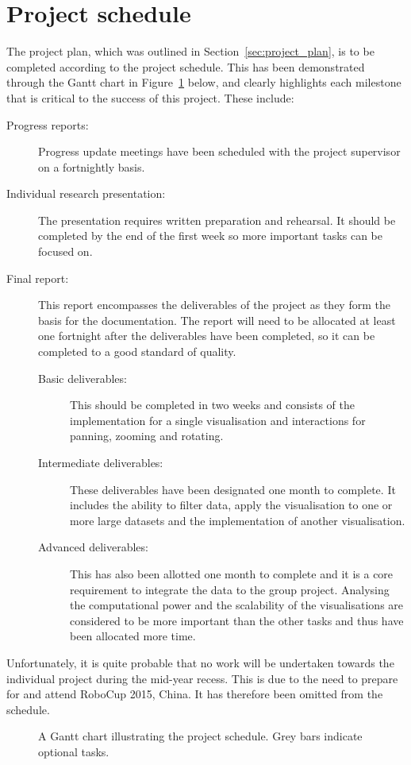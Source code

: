 \documentclass[
	fontsize=11pt
	headlines=2,
	footlines=2,
	parskip=half
]{scrartcl}
\begin{document}
	\section{Project schedule} {
	\label{sec:project_schedule}
	
		The project plan, which was outlined in Section~\ref{sec:project_plan}, is to be completed according to the project schedule. This has been demonstrated through the Gantt chart in Figure~\ref{gantt:schedule} below, and clearly highlights each milestone that is critical to the success of this project. These include:
		
		\begin{description}
			\item[Progress reports:] Progress update meetings have been scheduled with the project supervisor on a fortnightly basis.
			\item[Individual research presentation:] The presentation requires written preparation and rehearsal. It should be completed by the end of the first week so more important tasks can be focused on.
			\item[Final report:] This report encompasses the deliverables of the project as they form the basis for the documentation. The report will need to be allocated at least one fortnight after the deliverables have been completed, so it can be completed to a good standard of quality.
			\begin{description}
				\item[Basic deliverables:] This should be completed in two weeks and consists of the implementation for a single visualisation and interactions for panning, zooming and rotating.
				\item[Intermediate deliverables:] These deliverables have been designated one month to complete. It includes the ability to filter data, apply the visualisation to one or more large datasets and the implementation of another visualisation.
				\item[Advanced deliverables:] This has also been allotted one month to complete and it is a core requirement to integrate the data to the group project. Analysing the computational power and the scalability of the visualisations are considered to be more important than the other tasks and thus have been allocated more time.
			\end{description}
		\end{description}
		
		Unfortunately, it is quite probable that no work will be undertaken towards the individual project during the mid-year recess. This is due to the need to prepare for and attend RoboCup 2015, China. It has therefore been omitted from the schedule.
        
		\begin{figure}[H]
	        \resizebox{\textwidth}{!}{}
			\caption[Project schedule] {A Gantt chart illustrating the project schedule. Grey bars indicate optional tasks.}
			\label{gantt:schedule}
		\end{figure}
		
	}
	
\end{document}
